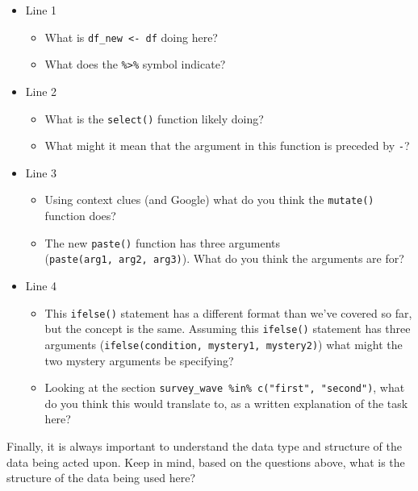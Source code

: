\documentclass[
]{book}
\providecommand{\tightlist}{%
  \setlength{\itemsep}{0pt}\setlength{\parskip}{0pt}}
\begin{document}
\begin{itemize}
\tightlist
\item
  Line 1

  \begin{itemize}
  \tightlist
  \item
    What is \texttt{df\_new\ \textless{}-\ df} doing here?
  \item
    What does the \texttt{\%\textgreater{}\%} symbol indicate?
  \end{itemize}
\item
  Line 2

  \begin{itemize}
  \tightlist
  \item
    What is the \texttt{select()} function likely doing?
  \item
    What might it mean that the argument in this function is preceded by \texttt{-}?
  \end{itemize}
\item
  Line 3

  \begin{itemize}
  \tightlist
  \item
    Using context clues (and Google) what do you think the \texttt{mutate()} function does?
  \item
    The new \texttt{paste()} function has three arguments (\texttt{paste(arg1,\ arg2,\ arg3)}). What do you think the arguments are for?
  \end{itemize}
\item
  Line 4

  \begin{itemize}
  \tightlist
  \item
    This \texttt{ifelse()} statement has a different format than we've covered so far, but the concept is the same. Assuming this \texttt{ifelse()} statement has three arguments (\texttt{ifelse(condition,\ mystery1,\ mystery2)}) what might the two mystery arguments be specifying?
  \item
    Looking at the section \texttt{survey\_wave\ \%in\%\ c("first",\ "second")}, what do you think this would translate to, as a written explanation of the task here?
  \end{itemize}
\end{itemize}

Finally, it is always important to understand the data type and structure of the data being acted upon. Keep in mind, based on the questions above, what is the structure of the data being used here?
\end{document}
